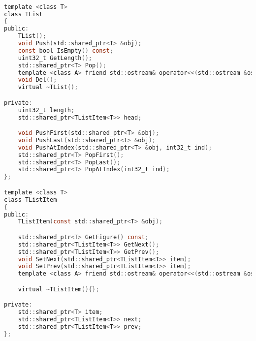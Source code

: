 \begin{lstlisting}[language=C]

template <class T>
class TList
{
public:
    TList();
    void Push(std::shared_ptr<T> &obj);
    const bool IsEmpty() const;
    uint32_t GetLength();
    std::shared_ptr<T> Pop();
    template <class A> friend std::ostream& operator<<(std::ostream &os, const TList<A> &list);
    void Del();
    virtual ~TList();

private:
    uint32_t length;
    std::shared_ptr<TListItem<T>> head;

    void PushFirst(std::shared_ptr<T> &obj);
    void PushLast(std::shared_ptr<T> &obj);
    void PushAtIndex(std::shared_ptr<T> &obj, int32_t ind);
    std::shared_ptr<T> PopFirst();
    std::shared_ptr<T> PopLast();
    std::shared_ptr<T> PopAtIndex(int32_t ind);
};

template <class T>
class TListItem
{
public:
    TListItem(const std::shared_ptr<T> &obj);

    std::shared_ptr<T> GetFigure() const;
    std::shared_ptr<TListItem<T>> GetNext();
    std::shared_ptr<TListItem<T>> GetPrev();
    void SetNext(std::shared_ptr<TListItem<T>> item);
    void SetPrev(std::shared_ptr<TListItem<T>> item);
    template <class A> friend std::ostream& operator<<(std::ostream &os, const TListItem<A> &obj);

    virtual ~TListItem(){};

private:
    std::shared_ptr<T> item;
    std::shared_ptr<TListItem<T>> next;
    std::shared_ptr<TListItem<T>> prev;
};


\end{lstlisting}


